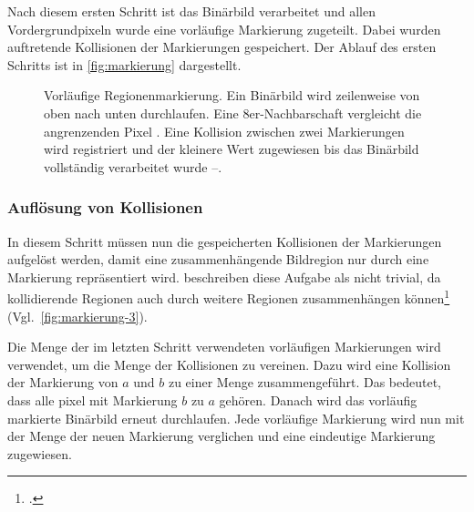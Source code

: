 Nach diesem ersten Schritt ist das Binärbild verarbeitet und allen Vordergrundpixeln wurde eine vorläufige Markierung
 zugeteilt. Dabei wurden auftretende Kollisionen der Markierungen gespeichert. Der Ablauf des ersten Schritts ist in
 \autoref{fig:markierung} dargestellt.
\begin{figure}[!ht]
	\centering
	\subfigure[]{
		\label{fig:markierung-binaer}
		
	}
	\subfigure[]{
		\label{fig:markierung-1}
		
	}
	\subfigure[]{
		\label{fig:markierung-2}
		
	}
	\subfigure[]{
		\label{fig:markierung-3}
		
	}
	\caption{Vorläufige Regionenmarkierung. Ein Binärbild  wird zeilenweise von
	 oben nach unten durchlaufen. Eine 8er-Nachbarschaft vergleicht die angrenzenden Pixel .
	 Eine Kollision zwischen zwei Markierungen wird registriert und der kleinere Wert zugewiesen bis das Binärbild
	 vollständig verarbeitet wurde --.}
	\label{fig:markierung}
\end{figure}


\subsubsection{Auflösung von Kollisionen} %
\label{sec:auflösung_von_kollisionen}

In diesem Schritt müssen nun die gespeicherten Kollisionen der Markierungen aufgelöst werden, damit eine
 zusammenhängende Bildregion nur durch eine Markierung repräsentiert wird. \citeauthor{burger05} beschreiben diese
 Aufgabe  als nicht trivial, da kollidierende Regionen auch durch weitere Regionen zusammenhängen
 können\footcite[Vgl.][S.~205]{burger05} (Vgl.~\autoref{fig:markierung-3}).

Die Menge der im letzten Schritt verwendeten vorläufigen Markierungen wird verwendet, um die Menge der Kollisionen
 zu vereinen. Dazu wird eine Kollision der Markierung von $a$ und $b$ zu einer Menge zusammengeführt. Das bedeutet,
 dass alle \gls{pixel} mit Markierung $b$ zu $a$ gehören. Danach wird das vorläufig markierte Binärbild erneut
 durchlaufen. Jede vorläufige Markierung wird nun mit der Menge der neuen Markierung verglichen und eine eindeutige
 Markierung zugewiesen.

